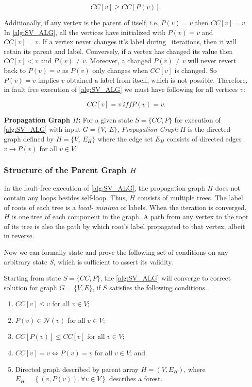 \begin{equation}
\label{eq:ccv-ccp}
CC[v] \geq CC[P(v)].
 \end{equation}

Additionally, if any vertex is the parent of itself, i.e. $P(v)=v$ then
$CC[v]=v$.  In \cref{alg:SV_ALG}, all the vertices have initialized with
$P(v)=v$ and $CC[v]=v$. If a vertex never changes it's label during
\sv~iterations, then it will retain its parent and label. Conversely, if a
vertex has changed its value then $CC[v]<v$ and $P(v)\neq v$. Moreover, a
changed $P(v)\neq v$ will never revert back to $P(v)=v$ as $P(v)$  only
changes when $CC[v]$ is changed. So $P(v)=v$ implies $v$ obtained a label from
itself, which is not possible. Therefore, in fault free execution of
\cref{alg:SV_ALG} we must have following for all vertices $v$:

\begin{equation}
\label{eq:root-cc}
CC[v] = v \ iff P(v)=v.
\end{equation}
 


\begin{defn}{ \textbf {Propagation Graph $H$:} }
\label{def:prforH}
For a given state $S=\{ CC, P\}$ for execution of \cref{alg:SV_ALG} with input 
$G=\{V,\ E\}$,  \emph{Propagation Graph} $H$ is the directed graph defined by $H=\{V,\ E_{H}\}$ where the edge set $E_{H}$ consists of directed edges $v\rightarrow P(v)$ for all $v \in V$. 
\end{defn}

\subsubsection{ Structure of the Parent Graph $H$} In the fault-free execution of
\cref{alg:SV_ALG}, the propagation graph $H$ does not contain any loops
besides self-loop. Thus, $H$ consists of multiple trees.  The label of roots
of each tree is a \emph{local- minima} of labels. When the iteration is
converged, $H$ is one tree of each component in the graph. A path from any
vertex to the root of its tree is also the path by which root's label propagated 
to that vertex, albeit in reverse.

Now we can formally state and prove the following set of conditions on any arbitrary state $S$, which is sufficient to assert its validity.

\begin{thm}
\label{thm:ss_valid}
Starting from state $S= \{CC,P \}$, the \cref{alg:SV_ALG} will converge to correct solution for graph $G=\{ V, E\}$, if $S$ satisfies the following conditions.
\begin{enumerate}
\item $CC[v]\leq v$  for all $v\in V$;
\item $P(v)\in\mathcal{N}(v)$ for all $v\in V$;
\item $CC[P(v)]\leq CC[v]$ for all $v\in V$; 
\item $CC[v] =v \iff P(v)=v$ for all $v\in V$; and 
\item Directed graph described by parent array $H=(V,E_{H})$, where $E_{H}=\left\{ (v,P(v)),\forall v\in V\right\} $
describes a forest. 
\end{enumerate}
\end{thm}